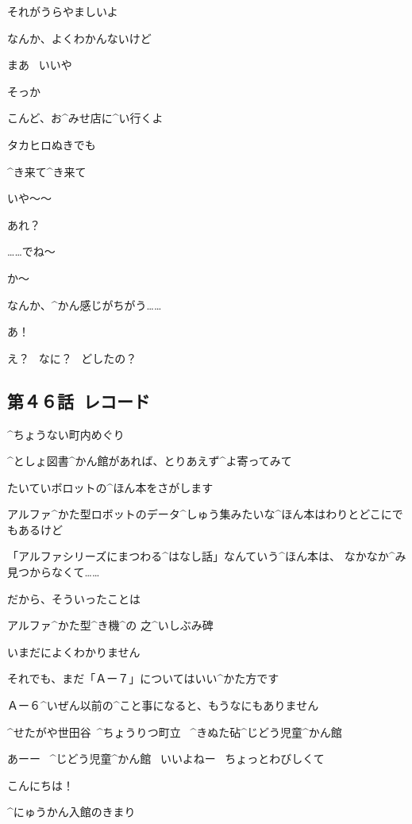 \Alpha それがうらやましいよ

\Makki なんか、よくわかんないけど

\Makki まあ
\ いいや

\Alpha そっか

\Makki こんど、お^{みせ}{店}に^{い}{行}くよ

\Makki タカヒロぬきでも

\Alpha ^{き}{来}て^{き}{来}て

\page
\Takahiro いや〜〜

\Takahiro あれ？

\Alpha ……でね〜

\Makki か〜

\Takahiro なんか、^{かん}{感}じがちがう……

\Alpha あ！

\Takahiro え？
\ なに？
\ どしたの？


\subsection{第４６話\ レコード}

\page[44]
\Kokone ^{ちょうない}{町内}めぐり

\Kokone ^{としょ}{図書}^{かん}{館}があれば、とりあえず^{よ}{寄}ってみて

\Kokone たいていボロットの^{ほん}{本}をさがします

\Kokone アルファ^{かた}{型}ロボットのデータ^{しゅう}{集}みたいな^{ほん}{本}はわりとどこにでもあるけど

\Kokone 「アルファシリーズにまつわる^{はなし}{話}」なんていう^{ほん}{本}は、
なかなか^{み}{見}つからなくて……

\page
\Kokone だから、そういったことは

\Sign アルファ^{かた}{型}^{き}{機}^{の }{之}^{いしぶみ}{碑}

\Kokone いまだによくわかりません

\Kokone それでも、まだ「Ａー７」についてはいい^{かた}{方}です

\Kokone Ａー６^{いぜん}{以前}の^{こと}{事}になると、もうなにもありません

\page
\Sign ^{せたがや}{世田谷}\ ^{ちょうりつ}{町立}
\ ^{きぬた}{砧}^{じどう}{児童}^{かん}{館}

\Kokone あーー
\ ^{じどう}{児童}^{かん}{館}
\ いいよねー
\ ちょっとわびしくて

\Kokone こんにちは！

\Sign ^{にゅうかん}{入館}のきまり

